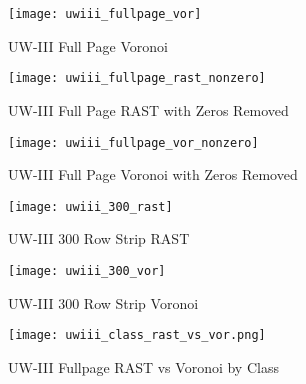 \documentclass[conference]{IEEEtran}
\begin{document}
\begin{figure}[uwiii-fullpage-vor]
\texttt{[image: uwiii\_fullpage\_vor]}
\caption{UW-III Full Page Voronoi}
\label{fig:uwiii-fullpage-vor}
\end{figure}

\begin{figure}[uwiii-fullpage-rast-nonzero]
\texttt{[image: uwiii\_fullpage\_rast\_nonzero]}
\caption{UW-III Full Page RAST with Zeros Removed}
\label{fig:uwiii-fullpage-rast-nonzero}
\end{figure}
%
\begin{figure}[uwiii-fullpage-vor-nonzero]
\texttt{[image: uwiii\_fullpage\_vor\_nonzero]}
\caption{UW-III Full Page Voronoi with Zeros Removed}
\label{fig:uwiii-fullpage-vor-nonzero}
\end{figure}

\begin{figure}[300-uwiii-rast]
\texttt{[image: uwiii\_300\_rast]}
\caption{UW-III 300 Row Strip RAST}
\label{fig:300-uwiii-rast}
\end{figure}

\begin{figure}[300-uwiii-vor]
\texttt{[image: uwiii\_300\_vor]}
\caption{UW-III 300 Row Strip Voronoi}
\label{fig:300-uwiii-vor}
\end{figure}

\begin{figure}[uwiii-rast-vs-vor-fullpage]
\texttt{[image: uwiii\_class\_rast\_vs\_vor.png]}
\caption{UW-III Fullpage RAST vs Voronoi by Class}
\label{fig:uwiii-rast-vs-vor-fullpage}
\end{figure}

%
\end{document}
